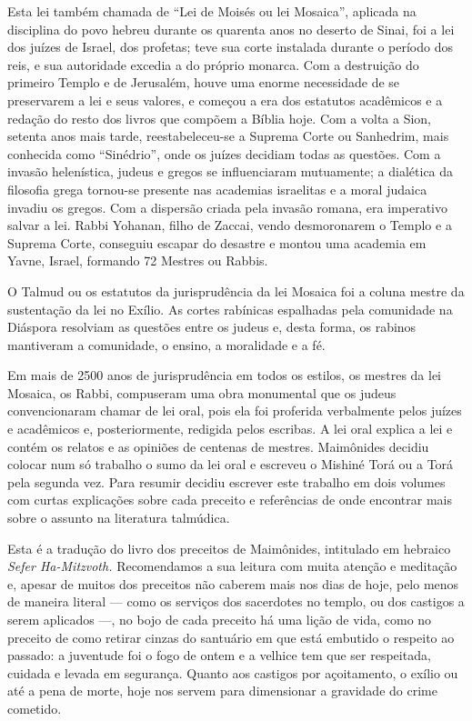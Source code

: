 Esta lei também chamada de ``Lei de Moisés ou lei Mosaica'', aplicada na
disciplina do povo hebreu durante os quarenta anos no deserto de Sinai,
foi a lei dos juízes de Israel, dos profetas; teve sua corte instalada
durante o período dos reis,
e sua autoridade excedia a do próprio monarca. Com a destruição do
primeiro Templo e de Jerusalém, houve uma enorme necessidade de se
preservarem a lei e seus valores, e começou a era dos estatutos
acadêmicos e a redação do resto dos livros que compõem a Bíblia hoje.
Com a volta a Sion, setenta anos mais tarde, reestabeleceu-se a Suprema
Corte ou Sanhedrim, mais conhecida como ``Sinédrio'', onde os juízes
decidiam todas as questões. Com a invasão helenística, judeus e gregos
se influenciaram mutuamente; a dialética da filosofia grega tornou-se
presente nas academias israelitas e a moral judaica invadiu os gregos.
Com a dispersão criada pela invasão romana, era imperativo salvar a lei.
Rabbi Yohanan, filho de Zaccai, vendo desmoronarem o Templo e a Suprema
Corte, conseguiu escapar do desastre e montou uma academia em Yavne,
Israel, formando 72 Mestres ou Rabbis.

O Talmud ou os estatutos da jurisprudência da lei Mosaica foi a coluna
mestre da sustentação da lei no Exílio. As cortes rabínicas espalhadas
pela comunidade na Diáspora resolviam as questões entre os judeus e,
desta forma, os rabinos mantiveram a comunidade, o ensino, a moralidade
e a fé.

Em mais de 2500 anos de jurisprudência em todos os estilos, os mestres
da lei Mosaica, os Rabbi, compuseram uma obra monumental que os judeus
convencionaram chamar de lei oral, pois ela foi proferida verbalmente
pelos juízes e acadêmicos e, posteriormente, redigida pelos escribas. A
lei oral explica a lei e contém os relatos e as opiniões de centenas de
mestres. Maimônides decidiu colocar num só trabalho o sumo da lei oral e
escreveu o Mishiné Torá ou a Torá pela segunda vez.
Para resumir decidiu escrever este trabalho em dois volumes com curtas
explicações sobre cada preceito e referências de onde encontrar mais
sobre o assunto na literatura talmúdica.

Esta é a tradução do livro dos preceitos de Maimônides, intitulado em
hebraico \emph{Sefer Ha-Mitzvoth.} Recomendamos a sua leitura com muita
atenção e meditação e, apesar de muitos dos preceitos não caberem mais
nos dias de hoje, pelo menos de maneira literal --- como os serviços dos
sacerdotes no templo, ou dos castigos a serem aplicados ---, no bojo de
cada preceito há uma lição de vida, como no preceito de como retirar
cinzas do santuário em que está embutido o respeito ao passado: a
juventude foi o fogo de ontem e a velhice tem que ser respeitada,
cuidada e levada em segurança. Quanto aos castigos por açoitamento, o
exílio ou até a pena de morte, hoje nos servem para dimensionar a
gravidade do crime cometido.

